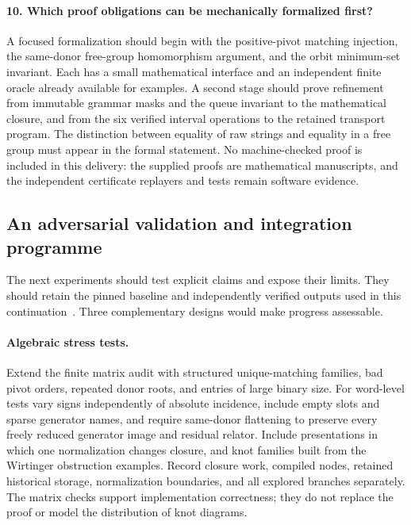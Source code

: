 \paragraph{10. Which proof obligations can be mechanically formalized first?}
A focused formalization should begin with the positive-pivot matching
injection, the same-donor free-group homomorphism argument, and the
orbit minimum-set invariant. Each has a small mathematical interface and
an independent finite oracle already available for examples. A second
stage should prove refinement from immutable grammar masks and the
queue invariant to the mathematical closure, and from the six verified
interval operations to the retained transport program. The distinction
between equality of raw strings and equality in a free group must appear
in the formal statement. No machine-checked proof is included in this
delivery: the supplied proofs are mathematical manuscripts, and the
independent certificate replayers and tests remain software evidence.

\subsection{An adversarial validation and integration programme}

The next experiments should test explicit claims and expose their limits.
They should retain the pinned baseline and independently verified outputs
used in this continuation~\cite{repo}. Three complementary designs would
make progress assessable.

\paragraph{Algebraic stress tests.}
Extend the finite matrix audit with structured unique-matching families,
bad pivot orders, repeated donor roots, and entries of large binary size.
For word-level tests vary signs independently of absolute incidence,
include empty slots and sparse generator names, and require same-donor
flattening to preserve every freely reduced generator image and residual
relator. Include presentations in which one normalization changes closure,
and knot families built from the Wirtinger obstruction examples. Record
closure work, compiled nodes, retained historical storage, normalization
boundaries, and all explored branches separately. The matrix checks
support implementation correctness; they do not replace the proof or
model the distribution of knot diagrams.


